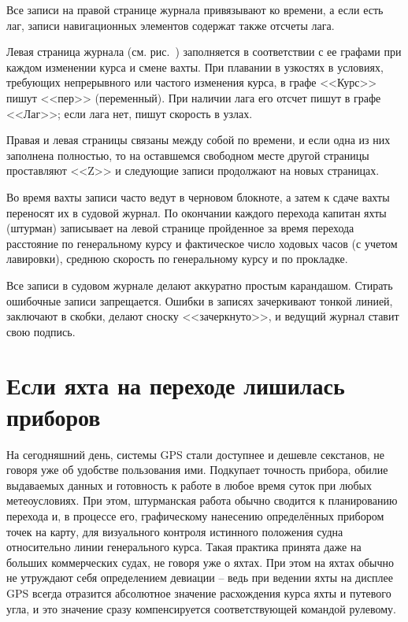 Все записи на правой странице журнала привязывают ко времени, а если есть лаг, записи навигационных элементов содержат также отсчеты лага.

Левая страница журнала (см. рис.~) заполняется в соответствии с ее графами при каждом изменении курса и смене вахты. При плавании в узкостях в условиях, требующих непрерывного или частого изменения курса, в графе <<Курс>> пишут <<пер>> (переменный). При наличии лага его отсчет пишут в графе <<Лаг>>; если лага нет, пишут скорость в узлах. 

Правая и левая страницы связаны между собой по времени, и если одна из них заполнена полностью, то на оставшемся свободном месте другой страницы проставляют <<Z>> и следующие записи продолжают на новых страницах.

Во время вахты записи часто ведут в черновом блокноте, а затем к сдаче вахты переносят их в судовой журнал. По окончании каждого перехода капитан яхты (штурман) записывает на левой странице пройденное за время перехода расстояние по генеральному курсу и фактическое число ходовых часов (с учетом лавировки), среднюю скорость по генеральному курсу и по прокладке.

Все записи в судовом журнале делают аккуратно простым карандашом. Стирать ошибочные записи запрещается. Ошибки в записях зачеркивают тонкой линией, заключают в скобки, делают сноску <<зачеркнуто>>, и ведущий журнал ставит свою подпись.

\section{Если яхта на переходе лишилась приборов}

На сегодняшний день, системы GPS стали доступнее и дешевле секстанов, не говоря уже об удобстве пользования ими. Подкупает точность прибора, обилие выдаваемых данных и готовность к работе в любое время суток при любых метеоусловиях. При этом, штурманская работа обычно сводится к планированию перехода и, в процессе его, графическому нанесению определённых прибором точек на карту, для визуального контроля истинного положения судна относительно линии генерального курса. Такая практика принята даже на больших коммерческих судах, не говоря уже о яхтах. При этом на яхтах обычно не утруждают себя определением девиации \--- ведь при ведении яхты на дисплее GPS всегда отразится абсолютное значение расхождения курса яхты и путевого угла, и это значение сразу компенсируется соответствующей командой рулевому. 

